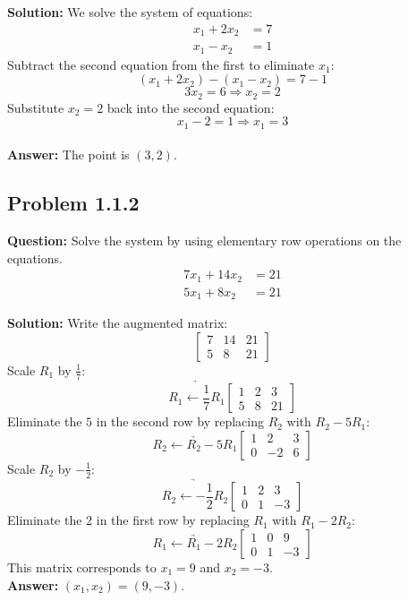 \documentclass[11pt]{article}
\begin{document}
\textbf{Solution:}
We solve the system of equations:
\begin{align*}
    x_1 + 2x_2 &= 7 \\
    x_1 - x_2 &= 1
\end{align*}
Subtract the second equation from the first to eliminate $x_1$:
\[ (x_1 + 2x_2) - (x_1 - x_2) = 7 - 1 \]
\[ 3x_2 = 6 \Rightarrow x_2 = 2 \]
Substitute $x_2 = 2$ back into the second equation:
\[ x_1 - 2 = 1 \Rightarrow x_1 = 3 \]
\\
\textbf{Answer:} The point is $(3, 2)$.


\subsection*{Problem 1.1.2}
\textbf{Question:} Solve the system by using elementary row operations on the equations.
\begin{align*}
    7x_1 + 14x_2 &= 21 \\
    5x_1 + 8x_2 &= 21
\end{align*}

\textbf{Solution:}
Write the augmented matrix:
\[
\begin{bmatrix}
7 & 14 & 21 \\
5 & 8 & 21
\end{bmatrix}
\]
Scale $R_1$ by $\frac{1}{7}$:
\[
\underrightarrow{R_1 \leftarrow \frac{1}{7}R_1}
\begin{bmatrix}
1 & 2 & 3 \\
5 & 8 & 21
\end{bmatrix}
\]
Eliminate the $5$ in the second row by replacing $R_2$ with $R_2 - 5R_1$:
\[
\underrightarrow{R_2 \leftarrow R_2 - 5R_1}
\begin{bmatrix}
1 & 2 & 3 \\
0 & -2 & 6
\end{bmatrix}
\]
Scale $R_2$ by $-\frac{1}{2}$:
\[
\underrightarrow{R_2 \leftarrow -\frac{1}{2}R_2}
\begin{bmatrix}
1 & 2 & 3 \\
0 & 1 & -3
\end{bmatrix}
\]
Eliminate the $2$ in the first row by replacing $R_1$ with $R_1 - 2R_2$:
\[
\underrightarrow{R_1 \leftarrow R_1 - 2R_2}
\begin{bmatrix}
1 & 0 & 9 \\
0 & 1 & -3
\end{bmatrix}
\]
This matrix corresponds to $x_1 = 9$ and $x_2 = -3$.
\\
\textbf{Answer:} $(x_1, x_2) = (9, -3)$.
\end{document}
